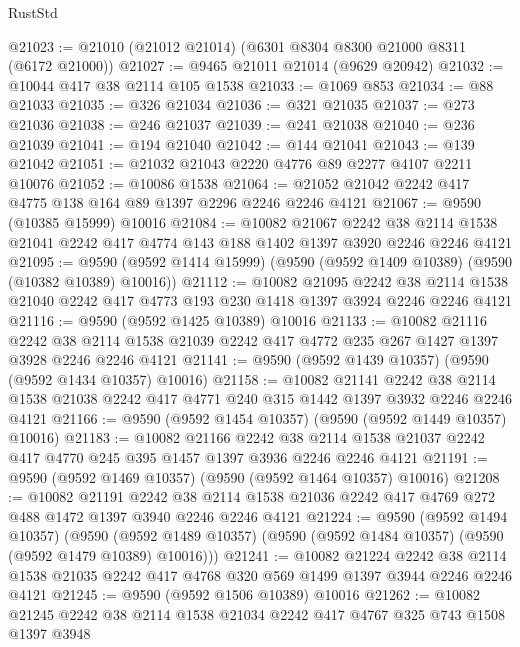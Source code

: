 \begin{lexlean}{RustStd}
\begin{coremodule}
@21023 := @21010 (@21012 @21014) (@6301 @8304 @8300 @21000 @8311 (@6172 @21000))
@21027 := @9465 @21011 @21014 (@9629 @20942)
@21032 := @10044 @417 @38 @2114 @105 @1538
@21033 := @1069 @853
@21034 := @88 @21033
@21035 := @326 @21034
@21036 := @321 @21035
@21037 := @273 @21036
@21038 := @246 @21037
@21039 := @241 @21038
@21040 := @236 @21039
@21041 := @194 @21040
@21042 := @144 @21041
@21043 := @139 @21042
@21051 := @21032 @21043 @2220 @4776 @89 @2277 @4107 @2211 @10076
@21052 := @10086 @1538
@21064 := @21052 @21042 @2242 @417 @4775 @138 @164 @89 @1397 @2296 @2246 @2246 @4121
@21067 := @9590 (@10385 @15999) @10016
@21084 := @10082
    @21067
    @2242
    @38
    @2114
    @1538
    @21041
    @2242
    @417
    @4774
    @143
    @188
    @1402
    @1397
    @3920
    @2246
    @2246
    @4121
@21095 := @9590 (@9592 @1414 @15999) (@9590 (@9592 @1409 @10389) (@9590 (@10382 @10389) @10016))
@21112 := @10082
    @21095
    @2242
    @38
    @2114
    @1538
    @21040
    @2242
    @417
    @4773
    @193
    @230
    @1418
    @1397
    @3924
    @2246
    @2246
    @4121
@21116 := @9590 (@9592 @1425 @10389) @10016
@21133 := @10082
    @21116
    @2242
    @38
    @2114
    @1538
    @21039
    @2242
    @417
    @4772
    @235
    @267
    @1427
    @1397
    @3928
    @2246
    @2246
    @4121
@21141 := @9590 (@9592 @1439 @10357) (@9590 (@9592 @1434 @10357) @10016)
@21158 := @10082
    @21141
    @2242
    @38
    @2114
    @1538
    @21038
    @2242
    @417
    @4771
    @240
    @315
    @1442
    @1397
    @3932
    @2246
    @2246
    @4121
@21166 := @9590 (@9592 @1454 @10357) (@9590 (@9592 @1449 @10357) @10016)
@21183 := @10082
    @21166
    @2242
    @38
    @2114
    @1538
    @21037
    @2242
    @417
    @4770
    @245
    @395
    @1457
    @1397
    @3936
    @2246
    @2246
    @4121
@21191 := @9590 (@9592 @1469 @10357) (@9590 (@9592 @1464 @10357) @10016)
@21208 := @10082
    @21191
    @2242
    @38
    @2114
    @1538
    @21036
    @2242
    @417
    @4769
    @272
    @488
    @1472
    @1397
    @3940
    @2246
    @2246
    @4121
@21224 := @9590
    (@9592 @1494 @10357)
    (@9590 (@9592 @1489 @10357) (@9590 (@9592 @1484 @10357) (@9590 (@9592 @1479 @10389) @10016)))
@21241 := @10082
    @21224
    @2242
    @38
    @2114
    @1538
    @21035
    @2242
    @417
    @4768
    @320
    @569
    @1499
    @1397
    @3944
    @2246
    @2246
    @4121
@21245 := @9590 (@9592 @1506 @10389) @10016
@21262 := @10082
    @21245
    @2242
    @38
    @2114
    @1538
    @21034
    @2242
    @417
    @4767
    @325
    @743
    @1508
    @1397
    @3948

\end{coremodule}
\end{lexlean}
